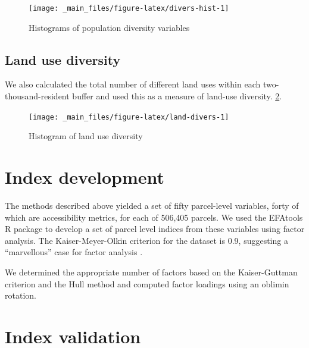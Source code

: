 \documentclass[
]{book}
\begin{document}
\begin{figure}

{\centering \texttt{[image: \_main\_files/figure-latex/divers-hist-1]} 

}

\caption{Histograms of population diversity variables}\label{fig:divers-hist}
\end{figure}

\hypertarget{land-use-diversity}{%
\subsection{Land use diversity}\label{land-use-diversity}}

We also calculated the total number of different land uses within each
two-thousand-resident buffer and used this as a measure of land-use diversity.
\ref{fig:land-divers}.

\begin{figure}

{\centering \texttt{[image: \_main\_files/figure-latex/land-divers-1]} 

}

\caption{Histogram of land use diversity}\label{fig:land-divers}
\end{figure}

\hypertarget{index-development}{%
\section{Index development}\label{index-development}}

The methods described above yielded a set of fifty parcel-level variables,
forty of which are accessibility metrics, for each of 506,405 parcels. We used
the EFAtools R package \citep{EFAtools} to develop a set of parcel level indices from
these variables using factor analysis. The Kaiser-Meyer-Olkin criterion for the
dataset is 0.9, suggesting a ``marvellous'' case for factor analysis \citep{kaiser1974index}.

We determined the appropriate number of factors based on the Kaiser-Guttman criterion
\citep{guttman1954some} and the Hull method \citep{lorenzo2011hull} and computed factor loadings
using an oblimin rotation.

\hypertarget{index-validation}{%
\section{Index validation}\label{index-validation}}
\end{document}
